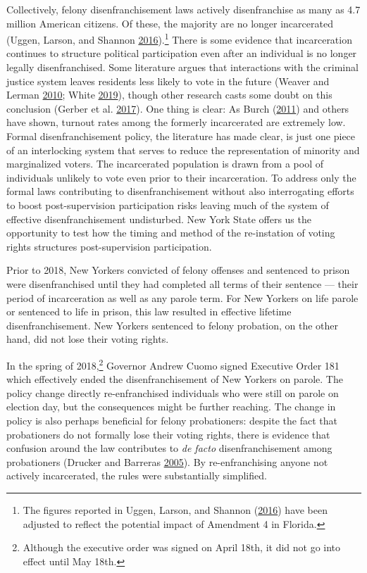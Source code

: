 \documentclass[
  12pt,
]{article}
\begin{document}
Collectively, felony disenfranchisement laws actively disenfranchise as many as 4.7 million American citizens. Of these, the majority are no longer incarcerated (Uggen, Larson, and Shannon \protect\hyperlink{ref-sentencing_2016}{2016}).\footnote{The figures reported in Uggen, Larson, and Shannon (\protect\hyperlink{ref-sentencing_2016}{2016}) have been adjusted to reflect the potential impact of Amendment 4 in Florida.} There is some evidence that incarceration continues to structure political participation even after an individual is no longer legally disenfranchised. Some literature argues that interactions with the criminal justice system leaves residents less likely to vote in the future (Weaver and Lerman \protect\hyperlink{ref-Weaver2010}{2010}; White \protect\hyperlink{ref-White2019}{2019}), though other research casts some doubt on this conclusion (Gerber et al. \protect\hyperlink{ref-Gerber2017}{2017}). One thing is clear: As Burch (\protect\hyperlink{ref-Burch2011}{2011}) and others have shown, turnout rates among the formerly incarcerated are extremely low. Formal disenfranchisement policy, the literature has made clear, is just one piece of an interlocking system that serves to reduce the representation of minority and marginalized voters. The incarcerated population is drawn from a pool of individuals unlikely to vote even prior to their incarceration. To address only the formal laws contributing to disenfranchisement without also interrogating efforts to boost post-supervision participation risks leaving much of the system of effective disenfranchisement undisturbed. New York State offers us the opportunity to test how the timing and method of the re-instation of voting rights structures post-supervision participation.

Prior to 2018, New Yorkers convicted of felony offenses and sentenced to prison were disenfranchised until they had completed all terms of their sentence --- their period of incarceration as well as any parole term. For New Yorkers on life parole or sentenced to life in prison, this law resulted in effective lifetime disenfranchisement. New Yorkers sentenced to felony probation, on the other hand, did not lose their voting rights.

In the spring of 2018,\footnote{Although the executive order was signed on April 18th, it did not go into effect until May 18th.} Governor Andrew Cuomo signed Executive Order 181 which effectively ended the disenfranchisement of New Yorkers on parole. The policy change directly re-enfranchised individuals who were still on parole on election day, but the consequences might be further reaching. The change in policy is also perhaps beneficial for felony probationers: despite the fact that probationers do not formally lose their voting rights, there is evidence that confusion around the law contributes to \emph{de facto} disenfranchisement among probationers (Drucker and Barreras \protect\hyperlink{ref-Drucker2005}{2005}). By re-enfranchising anyone not actively incarcerated, the rules were substantially simplified.
\end{document}
